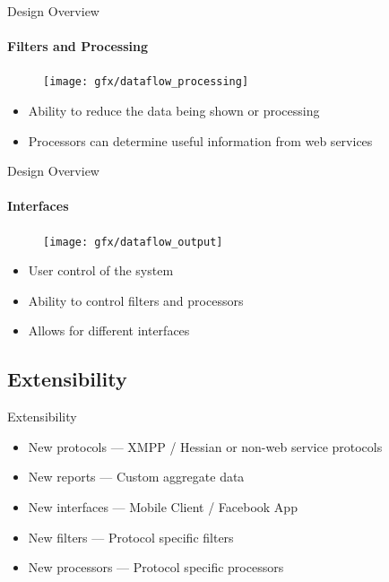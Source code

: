 \documentclass{beamer}
\begin{document}

\begin{frame}{Design Overview}
    \framesubtitle{Filters and Processing}
    \begin{figure}
        \vspace{-2em}
        \centering
        \texttt{[image: gfx/dataflow\_processing]}
        \vspace{-3em}
    \end{figure}
    \begin{itemize}
       \item{Ability to reduce the data being shown or processing}
       \item{Processors can determine useful information from web services}
    \end{itemize}
\end{frame}


\begin{frame}{Design Overview}
    \framesubtitle{Interfaces}
    \begin{figure}
        \vspace{-2em}
        \centering
        \texttt{[image: gfx/dataflow\_output]}
        \vspace{-3em}
    \end{figure}
    \begin{itemize}
        \item{User control of the system}
        \item{Ability to control filters and processors}
        \item{Allows for different interfaces}
    \end{itemize}
\end{frame}


\subsection{Extensibility}
\begin{frame}{Extensibility}
    \begin{itemize}
        \item New protocols --- XMPP / Hessian or non-web service protocols
        \item New reports --- Custom aggregate data
        \item New interfaces --- Mobile Client / Facebook App
        \item New filters --- Protocol specific filters
        \item New processors --- Protocol specific processors
    \end{itemize}
\end{frame}
\end{document}
